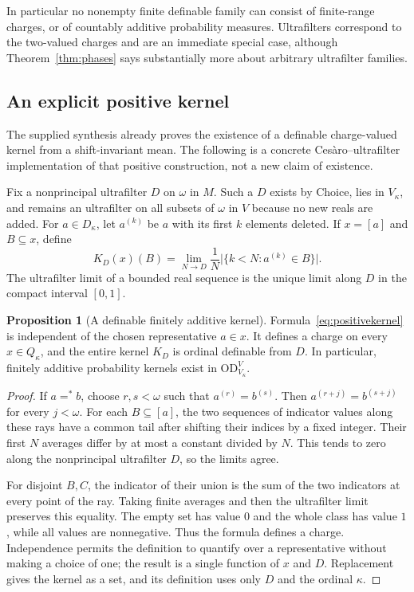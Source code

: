 \documentclass[11pt,letterpaper]{article}
\theoremstyle{definition}
\newtheorem{proposition}[definition]{Proposition}
\numberwithin{equation}{section}
\newcommand{\OD}{\mathrm{OD}}
\begin{document}
In particular no nonempty finite definable family can consist of
finite-range charges, or of countably additive probability measures.
Ultrafilters correspond to the two-valued charges and are an immediate
special case, although Theorem~\ref{thm:phases} says substantially more
about arbitrary ultrafilter families.

\subsection{An explicit positive kernel}

The supplied synthesis already proves the existence of a definable
charge-valued kernel from a shift-invariant mean. The following is a
concrete Ces\`aro--ultrafilter implementation of that positive construction,
not a new claim of existence.

Fix a nonprincipal ultrafilter $D$ on $\omega$ in $M$. Such a $D$ exists
by Choice, lies in $V_\kappa$, and remains an ultrafilter on all subsets of
$\omega$ in $V$ because no new reals are added.
For $a\in D_\kappa$, let $a^{(k)}$ be $a$ with its first $k$ elements
deleted. If $x=[a]$ and $B\subseteq x$, define
\begin{equation}\label{eq:positivekernel}
 K_D(x)(B)=\lim_{N\to D}\frac1N
       \bigl|\{k<N:a^{(k)}\in B\}\bigr|.
\end{equation}
The ultrafilter limit of a bounded real sequence is the unique limit along
$D$ in the compact interval $[0,1]$.

\begin{proposition}[A definable finitely additive kernel]\label{prop:positive}
Formula~\eqref{eq:positivekernel} is independent of the chosen
representative $a\in x$. It defines a charge on every $x\in Q_\kappa$,
and the entire kernel $K_D$ is ordinal definable from $D$. In particular,
finitely additive probability kernels exist in $\OD_{V_\kappa}^V$.
\end{proposition}

\begin{proof}
If $a=^*b$, choose $r,s<\omega$ such that
$a^{(r)}=b^{(s)}$. Then $a^{(r+j)}=b^{(s+j)}$ for every $j<\omega$.
For each $B\subseteq[a]$, the two sequences of indicator values along
these rays have a common tail after shifting their indices by a fixed
integer. Their first $N$ averages differ by at most a constant divided by
$N$. This tends to zero along the nonprincipal ultrafilter $D$, so the
limits agree.

For disjoint $B,C$, the indicator of their union is the sum of the two
indicators at every point of the ray. Taking finite averages and then the
ultrafilter limit preserves this equality. The empty set has value $0$ and
the whole class has value $1$, while all values are nonnegative. Thus the
formula defines a charge. Independence permits the definition to quantify
over a representative without making a choice of one; the result is a
single function of $x$ and $D$. Replacement gives the kernel as a set,
and its definition uses only $D$ and the ordinal $\kappa$.
\end{proof}
\end{document}
